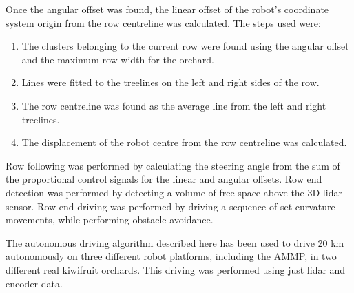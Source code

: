 \documentclass[preprint,authoryear,12pt]{elsarticle}
\begin{document}
        Once the angular offset was found, the linear offset of the robot’s coordinate system origin from the row centreline was calculated. The steps used were:
        \begin{enumerate}
        \item The clusters belonging to the current row were found using the angular offset and the maximum row width for the orchard.
        \item Lines were fitted to the treelines on the left and right sides of the row.
        \item The row centreline was found as the average line from the left and right treelines.
        \item The displacement of the robot centre from the row centreline was calculated.
        \end{enumerate}

        Row following was performed by calculating the steering angle from the sum of the proportional control signals for the linear and angular offsets. Row end detection was performed by detecting a volume of free space above the 3D lidar sensor. Row end driving was performed by driving a sequence of set curvature movements, while performing obstacle avoidance.

        The autonomous driving algorithm described here has been used to drive 20 km autonomously on three different robot platforms, including the AMMP, in two different real kiwifruit orchards. This driving was performed using just lidar and encoder data.
\end{document}
